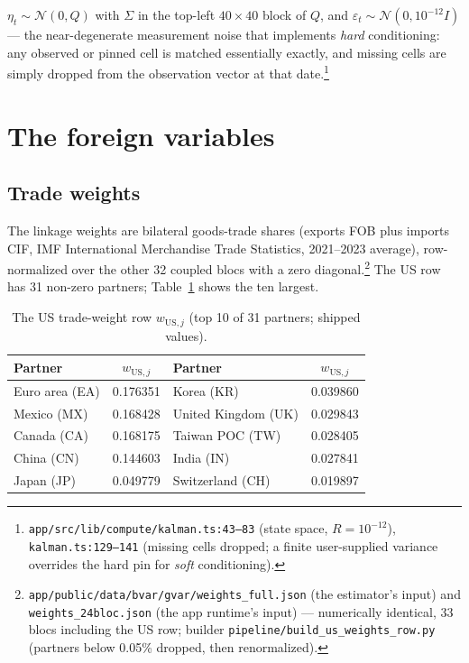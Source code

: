 \documentclass[11pt]{article}
\newcommand{\code}[1]{\texttt{\small #1}}
\begin{document}
$\eta_t \sim \mathcal{N}(0, Q)$ with $\Sigma$ in the top-left $40\times40$ block of $Q$, and
$\varepsilon_t \sim \mathcal{N}(0, 10^{-12} I)$ --- the near-degenerate measurement noise that
implements \emph{hard} conditioning: any observed or pinned cell is matched essentially exactly,
and missing cells are simply dropped from the observation vector at that
date.\footnote{\code{app/src/lib/compute/kalman.ts:43--83} (state space, $R=10^{-12}$),
\code{kalman.ts:129--141} (missing cells dropped; a finite user-supplied variance overrides the
hard pin for \emph{soft} conditioning).}

\section{The foreign variables}\label{sec:stars}

\subsection{Trade weights}

The linkage weights are bilateral goods-trade shares (exports FOB plus imports CIF, IMF
International Merchandise Trade Statistics, 2021--2023 average), row-normalized over the other 32
coupled blocs with a zero diagonal.\footnote{\code{app/public/data/bvar/gvar/weights\_full.json}
(the estimator's input) and \code{weights\_24bloc.json} (the app runtime's input) --- numerically
identical, 33 blocs including the US row; builder \code{pipeline/build\_us\_weights\_row.py}
(partners below 0.05\% dropped, then renormalized).} The US row has 31 non-zero partners;
Table~\ref{tab:weights} shows the ten largest.

\begin{table}[h]
\centering
\caption{The US trade-weight row $w_{\mathrm{US},j}$ (top 10 of 31 partners; shipped values).}
\label{tab:weights}
\small
\begin{tabular}{lc@{\qquad}lc}
\toprule
Partner & $w_{\mathrm{US},j}$ & Partner & $w_{\mathrm{US},j}$ \\
\midrule
Euro area (EA) & 0.176351 & Korea (KR)          & 0.039860 \\
Mexico (MX)    & 0.168428 & United Kingdom (UK) & 0.029843 \\
Canada (CA)    & 0.168175 & Taiwan POC (TW)     & 0.028405 \\
China (CN)     & 0.144603 & India (IN)          & 0.027841 \\
Japan (JP)     & 0.049779 & Switzerland (CH)    & 0.019897 \\
\bottomrule
\end{tabular}
\end{table}
\end{document}
